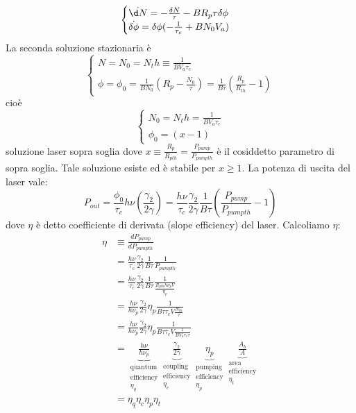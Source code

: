 \begin{equation*}
\begin{cases}
\dot{\d N} = -\frac{\delta N}{\tau} - B R_p \tau \delta \phi\\
\dot{\delta \phi} = \delta\phi(-\frac{1}{\tau_c} + BN_0V_a) 
\end{cases}
\end{equation*}
La seconda soluzione stazionaria è
\begin{equation*}
\begin{cases}
N = N_0 = N_th \equiv \frac{1}{BV_a\tau_c}\\
\phi = \phi_0 = \frac{1}{BN_0} \left(R_p - \frac{N_0}{\tau}\right) = \frac{1}{B\tau} \left(\frac{R_p}{R_{th}} - 1\right)
\end{cases}
\end{equation*}
cioè
\begin{equation*}
\begin{cases}
N_0 = N_th = \frac{1}{BV_a\tau_c}\\
\phi_0 = (x - 1)
\end{cases}
\end{equation*}
soluzione laser sopra soglia
dove $x \equiv \frac{R_p}{R_{pth}} = \frac{P_{pump}}{P_{pump th}}$ è il cosiddetto parametro di sopra soglia. Tale soluzione esiste ed è stabile per $x \geq 1$.
La potenza di uscita del laser vale:
\begin{equation*}
P_{out} = \frac{\phi_0}{\tau_c}h\nu \left(\frac{\gamma_2}{2\gamma}\right) = \frac{h\nu}{\tau_c} \frac{\gamma_2}{2\gamma} \frac{1}{B\tau} \left(\frac{P_{pump}}{P_{pump th}} - 1\right)
\end{equation*}
dove $\eta$ è detto coefficiente di derivata (slope efficiency) del laser.
Calcoliamo $\eta$:
\begin{align*}
\eta &\equiv \frac{dP_{pump}}{dP_{pump th}}\\
&= \frac{h\nu}{\tau_c} \frac{\gamma_2}{2\gamma} \frac{1}{B\tau} \frac{1}{P_{pump th}}\\
&= \frac{h\nu}{\tau_c} \frac{\gamma_2}{2\gamma} \frac{1}{B\tau} \frac{1}{\frac{R_{p th} h\nu_p V}{\eta_p}}\\
&= \frac{h\nu}{h\nu_p} \frac{\gamma_2}{2\gamma} \eta_p \frac{1}{B\tau\tau_c V \frac{N_{th}}{\tau}}\\
&= \frac{h\nu}{h\nu_p} \frac{\gamma_2}{2\gamma} \eta_p \frac{1}{B\tau\tau_c V \frac{1}{BV_a\tau_c\tau}}\\
&= \underbrace{\frac{h\nu}{h\nu_p}}_{\substack{\text{quantum}\\ \text{efficiency}\\ \eta_q}} \underbrace{\frac{\gamma_2}{2\gamma}}_{\substack{\text{coupling}\\ \text{efficiency}\\ \eta_c}}\underbrace{\eta_p}_{\substack{\text{pumping}\\ \text{efficiency}\\ \eta_p}} \underbrace{\frac{A_b}{A}}_{\substack{\text{area}\\ \text{efficiency}\\ \eta_t}}\\
&= \eta_q \eta_c \eta_p \eta_t
\end{align*}

